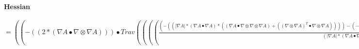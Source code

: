 \documentclass{article}
\begin{document}
 \paragraph{Hessian}
 
$= ((-((2*( \nabla A \bullet  \nabla  \otimes  \nabla A))) \bullet Trav(((( \frac{(-((| \nabla A|*( \nabla A \bullet  \nabla A)*(( \nabla A \bullet  \nabla  \otimes  \nabla  \otimes  \nabla A)+(( \nabla  \otimes  \nabla A)^T \bullet  \nabla  \otimes  \nabla A))))-(-(((((2*| \nabla A|*( \nabla A \bullet  \nabla  \otimes  \nabla A))+(( \nabla A \bullet  \nabla A)* \frac{( \nabla A \bullet  \nabla  \otimes  \nabla A)}{| \nabla A|}))*( \nabla A \bullet  \nabla  \otimes  \nabla A)))))^T)}{(| \nabla A|*( \nabla A \bullet  \nabla A)*| \nabla A|*( \nabla A \bullet  \nabla A))}* \nabla A))+Trav((( \nabla  \otimes  \nabla A* \frac{-((( \nabla A \bullet  \nabla  \otimes  \nabla A)))}{(| \nabla A|*( \nabla A \bullet  \nabla A))})))<2,:,0>+Trav(( \frac{1}{| \nabla A|}* \nabla  \otimes  \nabla  \otimes  \nabla A))<1,2,0>+Trav((( \frac{-((( \nabla A \bullet  \nabla  \otimes  \nabla A)))}{(| \nabla A|*( \nabla A \bullet  \nabla A))}* \nabla  \otimes  \nabla A)))<2,0,1>))<1,2,0>)+(((( \frac{-((( \nabla A \bullet  \nabla  \otimes  \nabla A)))}{(| \nabla A|*( \nabla A \bullet  \nabla A))}* \nabla A))+(( \frac{1}{| \nabla A|}* \nabla  \otimes  \nabla A))^T) \bullet (-((2*((( \nabla A \bullet  \nabla  \otimes  \nabla  \otimes  \nabla A))^T+((( \nabla  \otimes  \nabla A)^T \bullet  \nabla  \otimes  \nabla A))^T))))^T)+( \nabla A \bullet Trav((( \frac{1}{| \nabla A|}*-((2*(Trav(( \nabla A \bullet  \nabla  \otimes  \nabla  \otimes  \nabla  \otimes  \nabla A))<1,2,0>+Trav((Trav( \nabla  \otimes  \nabla  \otimes  \nabla A)<2,1,0> \bullet  \nabla  \otimes  \nabla A))<1,2,0>+Trav((( \nabla  \otimes  \nabla A)^T \bullet  \nabla  \otimes  \nabla  \otimes  \nabla A))<1,2,0>+Trav((( \nabla  \otimes  \nabla A)^T \bullet  \nabla  \otimes  \nabla  \otimes  \nabla A))<:,2,1>))))+Trav((( \frac{-((( \nabla A \bullet  \nabla  \otimes  \nabla A)))}{(| \nabla A|*( \nabla A \bullet  \nabla A))}*-((2*((( \nabla A \bullet  \nabla  \otimes  \nabla  \otimes  \nabla A))^T+((( \nabla  \otimes  \nabla A)^T \bullet  \nabla  \otimes  \nabla A))^T))))))<1,0,:>))<1,2,0>)+( \frac{1}{| \nabla A|}*(-((2*((( \nabla A \bullet  \nabla  \otimes  \nabla  \otimes  \nabla A))^T+((( \nabla  \otimes  \nabla A)^T \bullet  \nabla  \otimes  \nabla A))^T))) \bullet  \nabla  \otimes  \nabla A)))$
\end{document}
